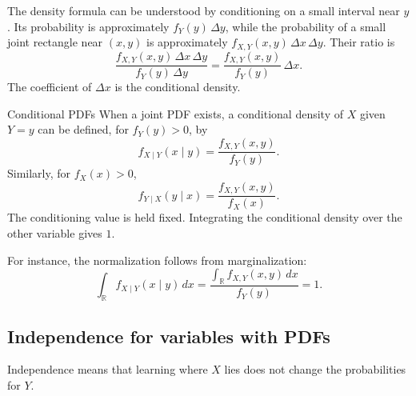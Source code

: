 \documentclass[a4paper,12pt,oneside]{report}
\begin{document}
The density formula can be understood by conditioning on a small
interval near $y$. Its probability is approximately
$f_Y(y)\,\Delta y$, while the probability of a small joint rectangle
near $(x,y)$ is approximately
$f_{X,Y}(x,y)\,\Delta x\,\Delta y$. Their ratio is
\[
  \frac{f_{X,Y}(x,y)\,\Delta x\,\Delta y}
       {f_Y(y)\,\Delta y}
  =\frac{f_{X,Y}(x,y)}{f_Y(y)}\,\Delta x.
\]
The coefficient of $\Delta x$ is the conditional density.

\begin{frameddefn}{Conditional PDFs}
\label{def:conditional-pdfs}
When a joint PDF exists, a conditional density of $X$ given $Y=y$
can be defined, for $f_Y(y)>0$, by
\[
  f_{X\mid Y}(x\mid y)=\frac{f_{X,Y}(x,y)}{f_Y(y)}.
\]
Similarly, for $f_X(x)>0$,
\[
  f_{Y\mid X}(y\mid x)=\frac{f_{X,Y}(x,y)}{f_X(x)}.
\]
The conditioning value is held fixed. Integrating the conditional
density over the other variable gives $1$.
\end{frameddefn}

For instance, the normalization follows from marginalization:
\[
  \int_{\mathbb R}f_{X\mid Y}(x\mid y)\,dx
    =\frac{\int_{\mathbb R}f_{X,Y}(x,y)\,dx}{f_Y(y)}=1.
\]
\subsection{Independence for variables with PDFs}

Independence means that learning where $X$ lies does not change
the probabilities for $Y$.
\end{document}
